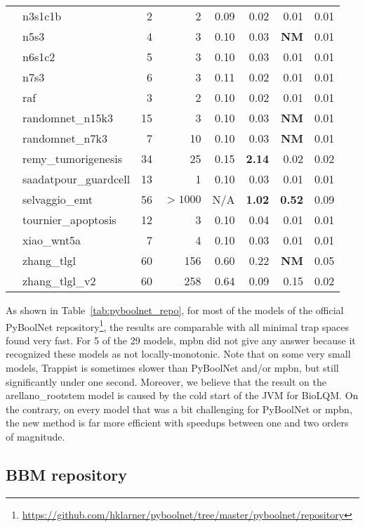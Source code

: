 \documentclass[preprint,12pt]{elsarticle}
\newcounter{rownumber}
\newcommand\rownb{\stepcounter{rownumber}\arabic{rownumber}}
\begin{document}
\begin{table}[!htb]
\begin{tabular}{rlrrrrrr}
    \rownb & n3s1c1b & 2 & 2 & 0.09 & 0.02 & 0.01 & 0.01\\
    \rownb & n5s3 & 4 & 3 & 0.10 & 0.03 & \textbf{NM} & 0.01\\
    \rownb & n6s1c2 & 5 & 3 & 0.10 & 0.03 & 0.01 & 0.01\\
    \rownb & n7s3 & 6 & 3 & 0.11 & 0.02 & 0.01 & 0.01\\
    \rownb & raf & 3 & 2 & 0.10 & 0.02 & 0.01 & 0.01\\
    \rownb & randomnet\_n15k3 & 15 & 3 & 0.10 & 0.03 & \textbf{NM} & 0.01\\
    \rownb & randomnet\_n7k3 & 7 & 10 & 0.10 & 0.03 & \textbf{NM} & 0.01\\
    \rownb & remy\_tumorigenesis & 34 & 25 & 0.15 & \textbf{2.14} & 0.02 & 0.02\\
    \rownb & saadatpour\_guardcell & 13 & 1 & 0.10 & 0.03 & 0.01 & 0.01\\
    \rownb & selvaggio\_emt & 56 & $>1000$ & N/A & \textbf{1.02} & \textbf{0.52} & 0.09\\
    \rownb & tournier\_apoptosis & 12 & 3 & 0.10 & 0.04 & 0.01 & 0.01\\
    \rownb & xiao\_wnt5a & 7 & 4 & 0.10 & 0.03 & 0.01 & 0.01\\
    \rownb & zhang\_tlgl & 60 & 156 & 0.60 & 0.22 & \textbf{NM} & 0.05\\
    \rownb & zhang\_tlgl\_v2 & 60 & 258 & 0.64 & 0.09 & 0.15 & 0.02\\
    \bottomrule
  \end{tabular}
\end{table}
\setcounter{rownumber}{0}

As shown in Table~\ref{tab:pyboolnet_repo}, for most of the models of the official PyBoolNet repository\footnote{\url{https://github.com/hklarner/pyboolnet/tree/master/pyboolnet/repository}}, the results are comparable with all minimal trap spaces found very fast.
For 5 of the 29 models, mpbn did not give any answer because it recognized these models as not locally-monotonic.
Note that on some very small models, Trappist is sometimes slower than PyBoolNet and/or mpbn, but still significantly under one second.
Moreover, we believe that the result on the arellano\_rootstem model is caused by the cold start of the JVM for BioLQM.\@
On the contrary, on every model that was a bit challenging for PyBoolNet or mpbn, the new method is far more efficient with speedups between one and two orders of magnitude.

\subsection{BBM repository}
\end{document}

